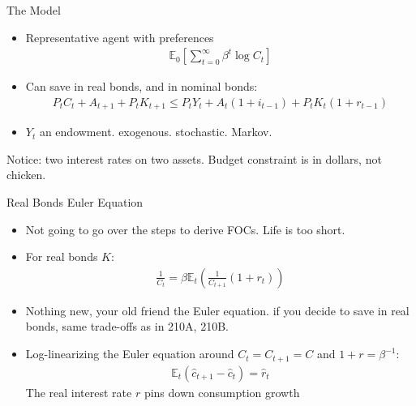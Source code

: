 \documentclass[11pt,aspectratio=169,xcolor={dvipsnames},hyperref={pdftex,pdfpagemode=UseNone,hidelinks,pdfdisplaydoctitle=true},usepdftitle=false]{beamer}
\begin{document}
\begin{frame}{The Model}
\begin{itemize}
\item Representative agent with preferences
\begin{align*}
\mathbb{E}_0 \left[ \sum_{t=0}^{\infty} \beta^t \log C_t \right]
\end{align*}
\item Can save in real bonds, and in nominal bonds:
\begin{align*}
P_t C_t + A_{t+1} + P_t K_{t+1} \leq P_t Y_t + A_t (1+i_{t-1})  + P_t K_t(1+r_{t-1})
\end{align*}
\item $Y_t$ an endowment. exogenous. stochastic. Markov.
\end{itemize}
Notice: two interest rates on two assets. Budget constraint is in dollars, not chicken.
\end{frame}

\begin{frame}{Real Bonds Euler Equation}
\begin{itemize}
\item Not going to go over the steps to derive FOCs. Life is too short.
\item For real bonds $K$:
\begin{align*}
\frac{1}{C_t} = \beta \mathbb{E}_t \left(\frac{1}{C_{t+1}}(1+r_t)\right)
\end{align*}
\item Nothing new, your old friend the Euler equation. if you decide to save in real bonds, same trade-offs as in 210A, 210B.
\item Log-linearizing the Euler equation around $C_t = C_{t+1} = C$ and $1+r = \beta^{-1}$:
\begin{align*}
\mathbb{E}_t (\hat{c}_{t+1} - \hat{c}_t) = \hat{r}_t
\end{align*}
The real interest rate $r$ pins down consumption growth
\end{itemize}
\end{frame}
\end{document}

